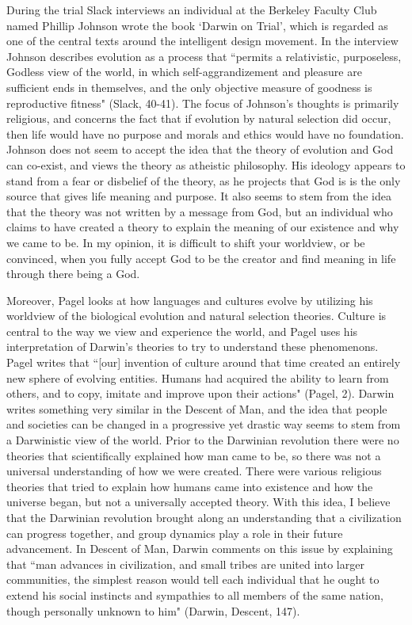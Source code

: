 \documentclass[11pt, oneside]{article}
\begin{document}
\par During the trial Slack interviews an individual at the Berkeley Faculty Club named Phillip Johnson wrote the book `Darwin on Trial', which is regarded as one of the central texts around the intelligent design movement. In the interview Johnson describes evolution as a process that ``permits a relativistic, purposeless, Godless view of the world, in which self-aggrandizement and pleasure are sufficient ends in themselves, and the only objective measure of goodness is reproductive fitness" (Slack, 40-41). The focus of Johnson's thoughts is primarily religious, and concerns the fact that if evolution by natural selection did occur, then life would have no purpose and morals and ethics would have no foundation. Johnson does not seem to accept the idea that the theory of evolution and God can co-exist, and views the theory as atheistic philosophy. His ideology appears to stand from a fear or disbelief of the theory, as he projects that God is is the only source that gives life meaning and purpose. It also seems to stem from the idea that the theory was not written by a message from God, but an individual who claims to have created a theory to explain the meaning of our existence and why we came to be. In my opinion, it is difficult to shift your worldview, or be convinced, when you fully accept God to be the creator and find meaning in life through there being a God.

\par Moreover, Pagel looks at how languages and cultures evolve by utilizing his worldview of the biological evolution and natural selection theories. Culture is central to the way we view and experience the world, and Pagel uses his interpretation of Darwin's theories to try to understand these phenomenons. Pagel writes that ``[our] invention of culture around that time created an entirely new sphere of evolving entities. Humans had acquired the ability to learn from others, and to copy, imitate and improve upon their actions" (Pagel, 2). Darwin writes something very similar in the Descent of Man, and the idea that people and societies can be changed in a progressive yet drastic way seems to stem from a Darwinistic view of the world. Prior to the Darwinian revolution there were no theories that scientifically explained how man came to be, so there was not a universal understanding of how we were created. There were various religious theories that tried to explain how humans came into existence and how the universe began, but not a universally accepted theory. With this idea, I believe that the Darwinian revolution brought along an understanding that a civilization can progress together, and group dynamics play a role in their future advancement. In Descent of Man, Darwin comments on this issue by explaining that ``man advances in civilization, and small tribes are united into larger communities, the simplest reason would tell each individual that he ought to extend his social instincts and sympathies to all members of the same nation, though personally unknown to him" (Darwin, Descent, 147). 
\end{document}
